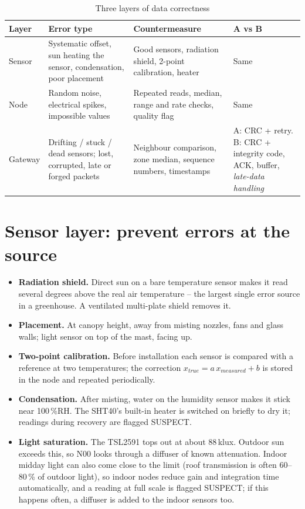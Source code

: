 \documentclass[11pt,a4paper]{report}
\begin{document}
\begin{table}[htbp]
\centering
\caption{Three layers of data correctness}\label{tab:layers}
\small
\begin{tabularx}{\textwidth}{>{\raggedright\arraybackslash}p{2.3cm} Y Y Y}
\toprule
\textbf{Layer} & \textbf{Error type} & \textbf{Countermeasure} & \textbf{A vs B}\\
\midrule
Sensor & Systematic offset, sun heating the sensor, condensation, poor placement & Good sensors, radiation shield, 2-point calibration, heater & Same\\
Node & Random noise, electrical spikes, impossible values & Repeated reads, median, range and rate checks, quality flag & Same\\
Gateway & Drifting / stuck / dead sensors; lost, corrupted, late or forged packets & Neighbour comparison, zone median, sequence numbers, timestamps & A: CRC + retry. B: CRC + integrity code, ACK, buffer, \emph{late-data handling}\\
\bottomrule
\end{tabularx}
\end{table}

\section{Sensor layer: prevent errors at the source}
\begin{itemize}
  \item \textbf{Radiation shield.} Direct sun on a bare temperature sensor makes it read several degrees above the real air temperature -- the largest single error source in a greenhouse. A ventilated multi-plate shield removes it.
  \item \textbf{Placement.} At canopy height, away from misting nozzles, fans and glass walls; light sensor on top of the mast, facing up.
  \item \textbf{Two-point calibration.} Before installation each sensor is compared with a reference at two temperatures; the correction $x_{true} = a\,x_{measured} + b$ is stored in the node and repeated periodically.
  \item \textbf{Condensation.} After misting, water on the humidity sensor makes it stick near 100\,\%RH. The SHT40's built-in heater is switched on briefly to dry it; readings during recovery are flagged SUSPECT.
  \item \textbf{Light saturation.} The TSL2591 tops out at about 88\,klux. Outdoor sun exceeds this, so N00 looks through a diffuser of known attenuation. Indoor midday light can also come close to the limit (roof transmission is often 60--80\,\% of outdoor light), so indoor nodes reduce gain and integration time automatically, and a reading at full scale is flagged SUSPECT; if this happens often, a diffuser is added to the indoor sensors too.
\end{itemize}
\end{document}
